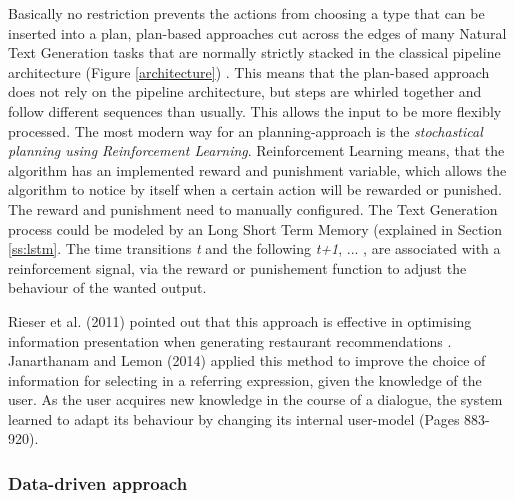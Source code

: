 Basically no restriction prevents the actions from choosing a type that can be inserted into a plan, plan-based approaches cut across the edges of many Natural Text Generation tasks that are normally strictly stacked in the classical pipeline architecture (Figure \ref{architecture}) \cite{gatt}. This means that the plan-based approach does not rely on the pipeline architecture, but steps are whirled together and follow different sequences than usually. This allows the input to be more flexibly processed. The most modern way for an planning-approach is the \textit{stochastical planning using Reinforcement Learning}. Reinforcement Learning means, that the algorithm has an implemented reward and punishment variable, which allows the algorithm to notice by itself when a certain action will be rewarded or punished. The reward and punishment need to manually configured. The Text Generation process could be modeled by an Long Short Term Memory (explained in Section \ref{ss:lstm}. The time transitions \textit{t} and the following \textit{t+1}, ... , are associated with a reinforcement signal, via the reward or punishement function to adjust the behaviour of the wanted output. 
	
Rieser et al. (2011) pointed out that this approach is effective in optimising information presentation when generating restaurant recommendations \cite{rieser}. Janarthanam and Lemon (2014) applied this method to improve the choice of information for selecting in a referring expression, given the knowledge of the user.  As the user acquires new knowledge in the course of a dialogue, the system learned to adapt its behaviour by changing its internal user-model \cite{janarthanam-lemon-2014-adaptive} (Pages 883-920).

\subsubsection{Data-driven approach}\label{ss:data}

